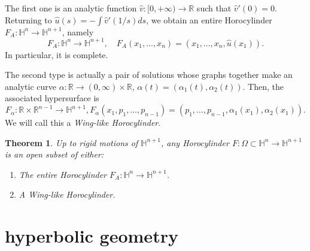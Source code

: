 \documentclass[12pt]{article}
\newtheorem{theorem}[lemma]{Theorem}
\numberwithin{lemma}{section}
\newcommand{\R}{\mathbb{R}}
\begin{document}
{The first one is an analytic function  $\hat{v}:[0,+\infty)\rightarrow\R$ such that $\hat{v}'(0)=0$. Returning to $\hat{u}(s)=-\int \hat{v}'(1/s)ds$, we obtain an entire Horocylinder ${F}_A:\mathbb{H}^{n}\rightarrow \mathbb{H}^{n+1}$, namely
\[F_A: \mathbb{H}^{n}\rightarrow \mathbb{H}^{n+1}, \quad 
F_A(x_1,\ldots,x_{n})=(x_1,\ldots,x_{n},\hat{u}(x_1)).\]
In particular, it is complete. 

The second type is actually a pair of solutions whose graphs  together make an analytic curve $\alpha:\R\rightarrow (0,\infty)\times\R$, $\alpha(t)=(\alpha_1(t),\alpha_2(t))$. Then, the associated hypersurface is 
\[ F_{\alpha} : \R\times \R^{n-1}\rightarrow \mathbb{H}^{n+1}, F_{\alpha}(x_1,p_1,\ldots,p_{n-1}) = (p_1,\ldots,p_{n-1},\alpha_1(x_1),\alpha_2(x_1)).
\]
We will call this a \textit{Wing-like Horocylinder}. 
\begin{theorem} Up to rigid motions of $\mathbb{H}^{n+1}$, any Horocylinder $F:\Omega\subset \mathbb{H}^{n}\rightarrow\mathbb{H}^{n+1}$ is an open subset of either:
\begin{enumerate}
\item The entire Horocylinder $F_A:\mathbb{H}^{n}\rightarrow\mathbb{H}^{n+1}$.
\item A Wing-like Horocylinder. 
\end{enumerate}
\end{theorem}

\section{hyperbolic geometry}
}
\end{document}
